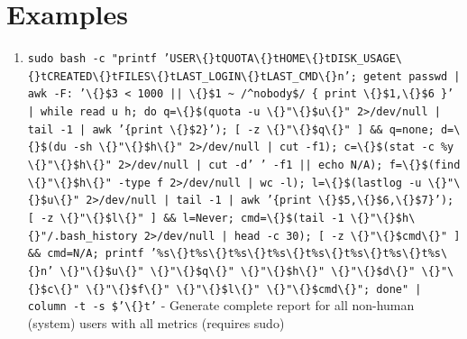 \documentclass[openany]{book}
\begin{document}
\section*{Examples}
\begin{enumerate}
  \item \texttt{sudo bash -c "printf 'USER\textbackslash\{\}tQUOTA\textbackslash\{\}tHOME\textbackslash\{\}tDISK\_USAGE\textbackslash\{\}tCREATED\textbackslash\{\}tFILES\textbackslash\{\}tLAST\_LOGIN\textbackslash\{\}tLAST\_CMD\textbackslash\{\}n'; getent passwd | awk -F: '\textbackslash\{\}\$3 < 1000 || \textbackslash\{\}\$1 \textasciitilde{} /\textasciicircum{}nobody\$/ \{ print \textbackslash\{\}\$1,\textbackslash\{\}\$6 \}' | while read u h; do q=\textbackslash\{\}\$(quota -u \textbackslash\{\}"\textbackslash\{\}\$u\textbackslash\{\}" 2>/dev/null | tail -1 | awk '\{print \textbackslash\{\}\$2\}'); [ -z \textbackslash\{\}"\textbackslash\{\}\$q\textbackslash\{\}" ] \&\& q=none; d=\textbackslash\{\}\$(du -sh \textbackslash\{\}"\textbackslash\{\}\$h\textbackslash\{\}" 2>/dev/null | cut -f1); c=\textbackslash\{\}\$(stat -c \%y \textbackslash\{\}"\textbackslash\{\}\$h\textbackslash\{\}" 2>/dev/null | cut -d' ' -f1 || echo N/A); f=\textbackslash\{\}\$(find \textbackslash\{\}"\textbackslash\{\}\$h\textbackslash\{\}" -type f 2>/dev/null | wc -l); l=\textbackslash\{\}\$(lastlog -u \textbackslash\{\}"\textbackslash\{\}\$u\textbackslash\{\}" 2>/dev/null | tail -1 | awk '\{print \textbackslash\{\}\$5,\textbackslash\{\}\$6,\textbackslash\{\}\$7\}'); [ -z \textbackslash\{\}"\textbackslash\{\}\$l\textbackslash\{\}" ] \&\& l=Never; cmd=\textbackslash\{\}\$(tail -1 \textbackslash\{\}"\textbackslash\{\}\$h\textbackslash\{\}"/.bash\_history 2>/dev/null | head -c 30); [ -z \textbackslash\{\}"\textbackslash\{\}\$cmd\textbackslash\{\}" ] \&\& cmd=N/A; printf '\%s\textbackslash\{\}t\%s\textbackslash\{\}t\%s\textbackslash\{\}t\%s\textbackslash\{\}t\%s\textbackslash\{\}t\%s\textbackslash\{\}t\%s\textbackslash\{\}t\%s\textbackslash\{\}n' \textbackslash\{\}"\textbackslash\{\}\$u\textbackslash\{\}" \textbackslash\{\}"\textbackslash\{\}\$q\textbackslash\{\}" \textbackslash\{\}"\textbackslash\{\}\$h\textbackslash\{\}" \textbackslash\{\}"\textbackslash\{\}\$d\textbackslash\{\}" \textbackslash\{\}"\textbackslash\{\}\$c\textbackslash\{\}" \textbackslash\{\}"\textbackslash\{\}\$f\textbackslash\{\}" \textbackslash\{\}"\textbackslash\{\}\$l\textbackslash\{\}" \textbackslash\{\}"\textbackslash\{\}\$cmd\textbackslash\{\}"; done" | column -t -s \$'\textbackslash\{\}t'} - Generate complete report for all non-human (system) users with all metrics (requires sudo)

\end{enumerate}
\end{document}
